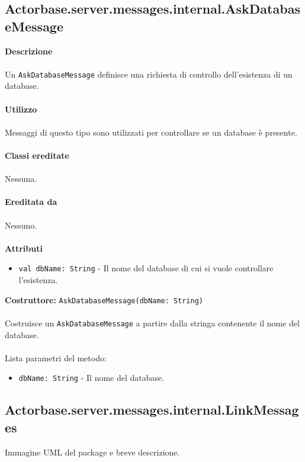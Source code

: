 \documentclass[a4paper]{article}
\begin{document}
	\subsection{Actorbase.server.messages.internal.AskDatabaseMessage}
		\textbf{Descrizione}
			\\ \\
			Un \texttt{AskDatabaseMessage} definisce una richiesta di controllo dell'esistenza di un database.
			\\ \\
		\textbf{Utilizzo}
			\\ \\
			Messaggi di questo tipo sono utilizzati per controllare se un database è presente.
			\\ \\
		\textbf{Classi ereditate}
			\\ \\
			Nessuna.
			\\ \\
		\textbf{Ereditata da}
			\\ \\
			Nessuno.
			\\ \\
		\textbf{Attributi}
			\begin{itemize}
				\item \texttt{val dbName: String} - Il nome del database di cui si vuole controllare l'esistenza.
			\end{itemize}
		\textbf{Costruttore:} \texttt{AskDatabaseMessage(dbName: String)}
		\\ \\
		Costruisce un \texttt{AskDatabaseMessage} a partire dalla stringa contenente il nome del database.
		\\ \\
		Lista parametri del metodo:
		\begin{itemize}
			\item \texttt{dbName: String} - Il nome del database.
		\end{itemize}
			
			
	\subsection{Actorbase.server.messages.internal.LinkMessages}
		Immagine UML del package e breve descrizione.
		
\end{document}
